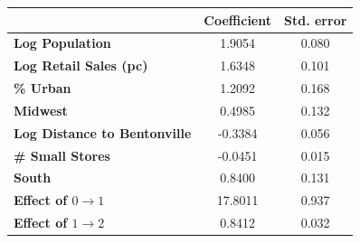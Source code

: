 \begin{center}
\begin{tabular}{lcc}
                                & \textbf{Coefficient} & \textbf{Std. error} \\
\midrule
\textbf{Log Population}               &       1.9054  &        0.080      \\
\textbf{Log Retail Sales (pc)} &       1.6348  &        0.101      \\
\textbf{\% Urban}             &       1.2092  &        0.168      \\
\textbf{Midwest}                &       0.4985  &        0.132      \\
\textbf{Log Distance to Bentonville}      &      -0.3384  &        0.056      \\
\textbf{\# Small Stores}       &      -0.0451  &        0.015      \\
\textbf{South}                  &       0.8400  &        0.131      \\
\textbf{Effect of $0\rightarrow1$}                    &      17.8011  &        0.937      \\
\textbf{Effect of $1\rightarrow2$}                    &       0.8412  &        0.032      \\
\bottomrule
\end{tabular}
\end{center}
